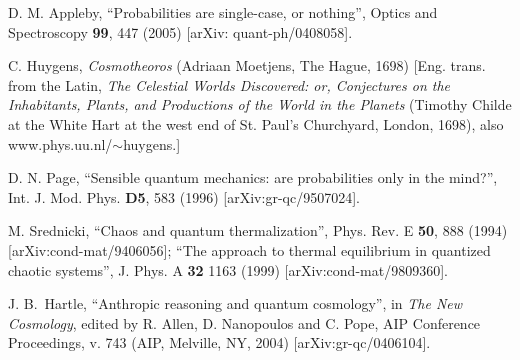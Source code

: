 \documentclass[pra,floatfix,preprint,nofootinbib,12pt]{revtex4}
\begin{document}
\begin{thebibliography}{99}
D. M. Appleby,
``Probabilities are single-case, or nothing'',
Optics and Spectroscopy {\bf 99}, 447 (2005)
[arXiv: quant-ph/0408058].

 C. Huygens, {\sl Cosmotheoros} (Adriaan Moetjens, The Hague, 1698) [Eng. trans. from the Latin, {\sl The Celestial Worlds Discovered: or, Conjectures on the Inhabitants, Plants, and Productions of the World in the Planets} (Timothy Childe at the White Hart at the west end of St. Paul's Churchyard, London, 1698), also www.phys.uu.nl/$\sim$huygens.]

 D. N. Page, 
``Sensible quantum mechanics: are probabilities only in the mind?'',
Int. J. Mod. Phys. {\bf D5}, 583 (1996) 
[arXiv:gr-qc/9507024].

 M. Srednicki, 
``Chaos and quantum thermalization'',
Phys. Rev. E {\bf 50}, 888 (1994) [arXiv:cond-mat/9406056];
``The approach to thermal equilibrium in quantized chaotic systems'',
J. Phys. A {\bf 32} 1163 (1999) 
[arXiv:cond-mat/9809360].

  J. B.~Hartle, 
``Anthropic reasoning and quantum cosmology'',
in {\it The New Cosmology}, 
edited by R. Allen, D. Nanopoulos and C. Pope, 
AIP Conference Proceedings, v. 743
(AIP, Melville, NY, 2004) [arXiv:gr-qc/0406104]. 

\end{thebibliography}
\end{document}
